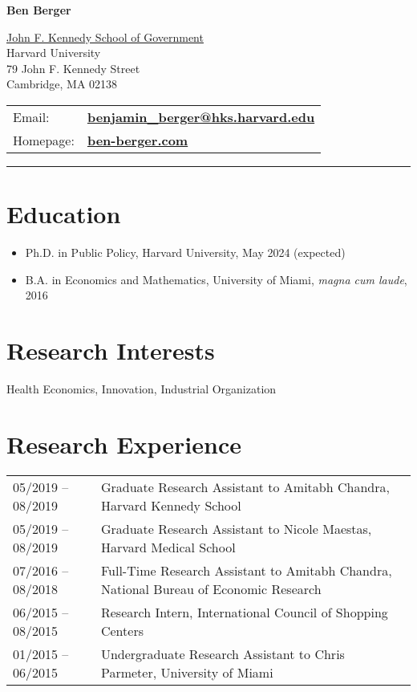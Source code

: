 \documentclass[letterpaper]{article}
\def\name{Ben Berger}
\begin{document}

\centerline{\huge \bf \name}

\vspace{2em}

\begin{minipage}{0.45\linewidth}
  \href{http://www.hks.harvard.edu/}{John F. Kennedy School of Government} \\
  Harvard University \\
  79 John F. Kennedy Street \\
  Cambridge, MA 02138
\end{minipage}
%
\begin{minipage}{0.45\linewidth}
  \begin{tabular}{ll}
    Email: & \href{mailto:benjamin\_berger@hks.harvard.edu}{\bf benjamin\_berger@hks.harvard.edu} \\
    Homepage: & \href{http://ben-berger.com/}{\bf ben-berger.com} 
  \end{tabular}
\end{minipage}

\vspace{.25em}
\hrule
\vspace{.5em}

\section*{Education}

\begin{itemize}
  \item Ph.D. in Public Policy, Harvard University, May 2024 (expected)
  \item B.A. in Economics and Mathematics, University of Miami, \textit{magna cum laude}, 2016
\end{itemize}

\section*{Research Interests}
Health Economics, Innovation, Industrial Organization 

\section*{Research Experience}
\begin{tabularx}{\linewidth}{@{} l X }
	05/2019 -- 08/2019 & Graduate Research Assistant to Amitabh Chandra, Harvard Kennedy School \\
	05/2019 -- 08/2019 & Graduate Research Assistant to Nicole Maestas, Harvard Medical School \\
	07/2016 -- 08/2018 & Full-Time Research Assistant to Amitabh Chandra, National Bureau of Economic Research \\
	06/2015 -- 08/2015 & Research Intern, International Council of Shopping Centers \\
	01/2015 -- 06/2015 & Undergraduate Research Assistant to Chris Parmeter, University of Miami
\end{tabularx} \\
\end{document}
